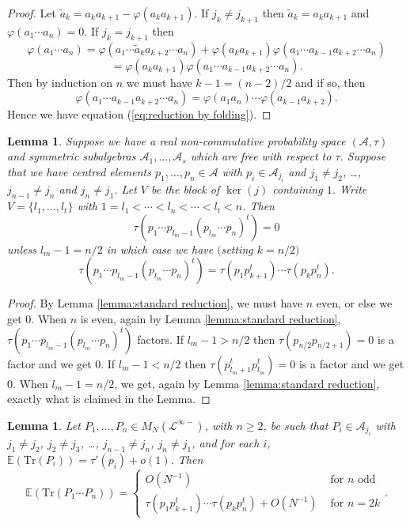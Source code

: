 \documentclass[11pt]{amsart}
\newtheorem{lemma}[theorem]{Lemma}
\theoremstyle{definition}
\numberwithin{theorem}{section}
\newcommand{\cA}{\mathcal{A}}
\newcommand{\cL}{\mathcal{L}}
\let\phi=\varphi
\newcommand{\rE} {\mathbb{E}}
\newcommand{\Tr}{\mathrm{Tr}}
\begin{document}
\begin{proof}
Let $\tilde{a}_k = a_k a_{k+1} - \phi(a_k a_{k+1})$. If $j_k
\not = j_{k+1}$ then $\tilde{a}_k = a_k a_{k+1}$ and
$\phi(a_1 \cdots a_n) = 0$. If $j_k = j_{k+1}$ then
\[
\phi(a_1 \cdots a_n) = \phi(a_1 \cdots \tilde{a}_k a_{k+2} \cdots a_n)
+ \phi(a_k a_{k+1}) \phi(a_1 \cdots a_{k-1} a_{k+2} \cdots a_n)
\]
\[
=
\phi(a_k a_{k+1}) \phi(a_1 \cdots a_{k-1} a_{k+2} \cdots a_n).
\]
Then by induction on $n$ we must have $k-1 = (n-2)/2$ and if so, then 
\[
\phi(a_1 \cdots a_{k-1} a_{k+2} \cdots a_n)
=
\phi(a_1a_n) \cdots \phi(a_{k-1} a_{k+2}). 
\]
Hence we have equation (\ref{eq:reduction by folding}).
\end{proof}

\begin{lemma}\label{lemma:intermediate reduction}
Suppose we have a real non-commutative probability space
$(\cA, \tau)$ and symmetric subalgebras $\cA_1, \dots,
\cA_s$ which are free with respect to $\tau$. Suppose that
we have centred elements $p_1, \dots, p_n \in \cA$ with $p_i
\in \cA_{j_i}$ and $j_1 \not = j_2$, \dots, $j_{n-1} \not =
j_n$ and $j_n \not = j_1$. Let $V$ be the block of $\ker(j)$
containing $1$. Write $V = \{l_1, \dots, l_t\}$ with $1= l_1
< \cdots < l_n < \cdots < l_t < n$. Then
\[
\tau(p_1 \cdots p_{l_m - 1} (p_{l_m} \cdots p_n)^t) = 0
\]
unless $l_{m} - 1 = n/2$ in which case we have $($setting $k= n/2)$
\[
\tau(p_1 \cdots p_{l_m -1}(p_{l_m} \cdots p_n)^t)
=
\tau(p_1 p_{k+1}^t) \cdots \tau(p_k p_{n}^t).
\]
\end{lemma}

\begin{proof}
By Lemma \ref{lemma:standard reduction}, we must have $n$
even, or else we get $0$. When $n$ is even, again by Lemma
\ref{lemma:standard reduction}, $\tau(p_1 \cdots p_{l_m
  -1}(p_{l_m} \cdots p_n)^t)$ factors. If $l_m - 1 > n/2$
then $\tau(p_{n/2} p_{n/2 + 1}) = 0$ is a factor and we get
$0$. If $l_m - 1 < n/2$ then $\tau(p_{l_m+1}^t p_{l_m}^t) =
0$ is a factor and we get $0$. When $l_m - 1 = n/2$, we get,
again by Lemma \ref{lemma:standard reduction}, exactly what
is claimed in the Lemma.
\end{proof}

\begin{lemma}\label{lemma:final reduction}
Let $P_1, \dots, P_n \in M_N(\cL^{\infty-})$, with $n \geq
2$, be such that $P_i \in \cA_{j_i}$ with $j_1 \not= j_2$,
$j_2 \not = j_3$, \dots, $j_{n-1} \not = j_n$, $j_n \not =
j_1$, and for each $i$, $\rE(\Tr(P_i)) = \tau'(p_i) + o(1)$.
Then
\begin{equation}
\rE(\Tr(P_1 \cdots P_n))
=
\begin{cases}
O(N^{-1}) & \mbox{\ for\ } n \mbox{\ odd} \\
\tau(p_1 p_{k+1}^t) \cdots \tau(p_k p_{n}^t) + O(N^{-1}) & \mbox{\ for\ } n = 2k
\end{cases}.
\end{equation}
\end{lemma}
\end{document}
